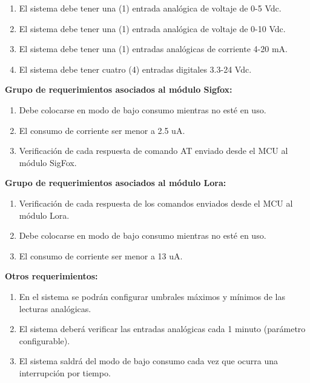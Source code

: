 \begin{enumerate}
\begin{itemize}
		\end{itemize}

		\item El sistema debe tener una (1) entrada analógica de voltaje de 0-5 Vdc.
		
		\item El sistema debe tener una (1) entrada analógica de voltaje de 0-10 Vdc.

		\item El sistema debe tener una (1) entradas analógicas de corriente 4-20 mA.

		\item El sistema debe tener cuatro (4) entradas digitales 3.3-24 Vdc.

\end{enumerate}



\textbf{Grupo de requerimientos asociados al módulo Sigfox:}

	\begin{enumerate}

		\item Debe colocarse en modo de bajo consumo mientras no esté en uso.
		
		\item El consumo de corriente ser menor a 2.5 uA.

		\item Verificación de cada respuesta de comando AT enviado desde el MCU al módulo SigFox.

	\end{enumerate}





\textbf{Grupo de requerimientos asociados al módulo Lora:}

	\begin{enumerate}

		\item Verificación de cada respuesta de los comandos enviados desde el MCU al módulo Lora.

		\item Debe colocarse en modo de bajo consumo mientras no esté en uso.
		
		\item El consumo de corriente ser menor a 13 uA.

	\end{enumerate}



\textbf{Otros requerimientos:}

\begin{enumerate}

	\item En el sistema se podrán configurar umbrales máximos y mínimos de las lecturas analógicas.

	\item El sistema deberá verificar las entradas analógicas cada 1 minuto (parámetro configurable).

	\item El sistema saldrá del modo de bajo consumo cada vez que ocurra una interrupción por tiempo.

\end{enumerate}



